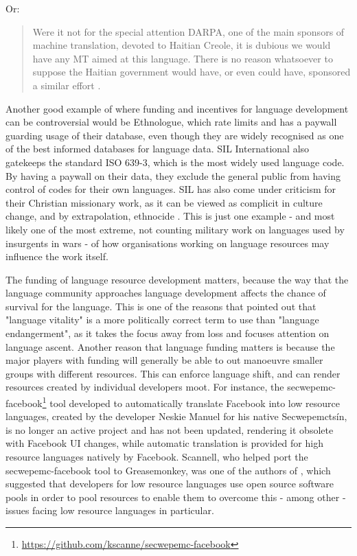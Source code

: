 Or:

\begin{quote}
Were it not for the special attention DARPA, one of the main sponsors of machine translation, devoted to Haitian Creole, it is dubious we would have any MT aimed at this language. There is no reason whatsoever to suppose the Haitian government would have, or even could have, sponsored a similar effort \citep{spice}. \citep[9]{kornai2013digital}
\end{quote}

Another good example of where funding and incentives for language development can be controversial would be Ethnologue, which rate limits and has a paywall guarding usage of their database, even though they are widely recognised as one of the best informed databases for language data. SIL International also gatekeeps the standard ISO 639-3, which is the most widely used language code. By having a paywall on their data, they exclude the general public from having control of codes for their own languages. SIL has also come under criticism for their Christian missionary work, as it can be viewed as complicit in culture change, and by extrapolation, ethnocide \citep{dobrin2009sil, dobrin2009practical, everett2009don}. This is just one example - and most likely one of the most extreme, not counting military work on languages used by insurgents in wars - of how organisations working on language resources may influence the work itself.

The funding of language resource development matters, because the way that the language community approaches language development affects the chance of survival for the language. This is one of the reasons that \citet{grenoble2016response} pointed out that "language vitality" is a more politically correct term to use than "language endangerment", as it takes the focus away from loss and focuses attention on language ascent. Another reason that language funding matters is because the major players with funding will generally be able to out manoeuvre smaller groups with different resources. This can enforce language shift, and can render resources created by individual developers moot. For instance, the secwepemc-facebook\footnote{\href{https://github.com/kscanne/secwepemc-facebook}{https://github.com/kscanne/secwepemc-facebook}} tool developed to automatically translate Facebook into low resource languages, created by the developer Neskie Manuel for his native Secwepemcts\'in, is no longer an active project and has not been updated, rendering it obsolete with Facebook UI changes, while automatic translation is provided for high resource languages natively by Facebook. Scannell, who helped port the secwepemc-facebook tool to Greasemonkey, was one of the authors of \citet{streiter2006implementing}, which suggested that developers for low resource languages use open source software pools in order to pool resources to enable them to overcome this - among other - issues facing low resource languages in particular.


